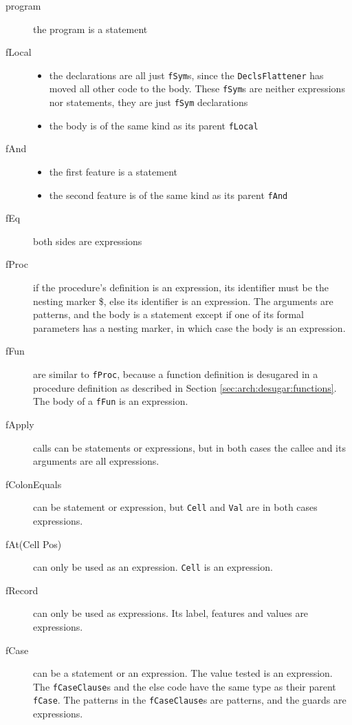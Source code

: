 \documentclass[a4paper]{memoir}
\begin{document}
\begin{description}
  \item[program] the program is a statement
  \item[fLocal] 
    \begin{itemize}
      \item the declarations are all just \lstinline!fSym!s, since the
        \lstinline!DeclsFlattener! has
        moved all other code to the body. These \lstinline!fSym!s are neither
        expressions nor statements, they are just \lstinline!fSym! declarations
      \item the body is of the same kind as its parent \lstinline!fLocal!
    \end{itemize}
  \item[fAnd] 
    \begin{itemize}
      \item the first feature is a statement
      \item the second feature is of the same kind as its parent \lstinline!fAnd!
    \end{itemize}
  \item[fEq] both sides are expressions
  \item[fProc] if the procedure's definition is an expression, its identifier
    must be the nesting marker \$, else its identifier is an expression. The
    arguments are patterns, and the body is a statement except if one of its
    formal parameters has a nesting marker, in which case the body is an
    expression.
  \item[fFun] are similar to \lstinline!fProc!, because a function definition is desugared
    in a procedure definition as described in Section
    \ref{sec:arch:desugar:functions}. The body of a \lstinline!fFun! is an expression.
  \item[fApply] calls can be statements or expressions, but in both cases the callee and its arguments are all expressions. 
  \item[fColonEquals] can be statement or expression, but \lstinline!Cell! and
    \lstinline!Val! are in both cases expressions.
  \item[fAt(Cell Pos)] can only be used as an expression. \lstinline!Cell! is an expression.
  \item[fRecord] can only be used as expressions. Its label, features and values are
    expressions.
  \item[fCase] can be a statement or an expression. The value tested is an
    expression. The \lstinline!fCaseClause!s
    and the else code have the same type as their parent \lstinline!fCase!. The patterns in
    the \lstinline!fCaseClause!s are patterns, and the guards are expressions.
\end{description}
\end{document}
